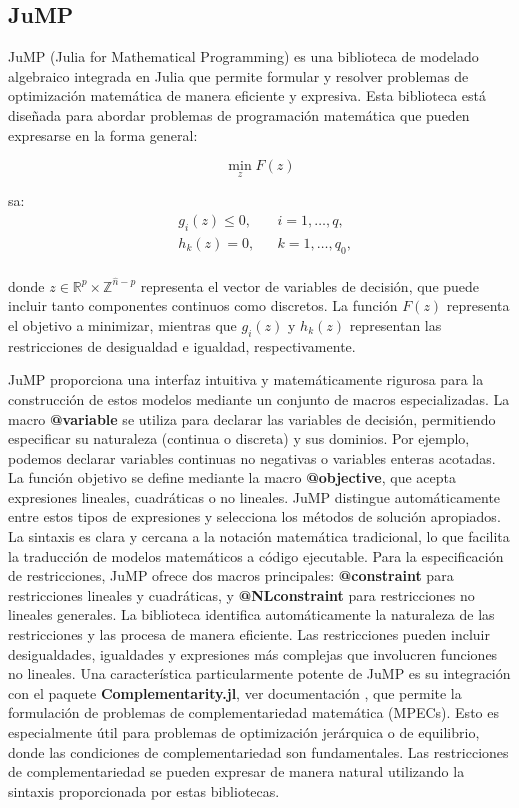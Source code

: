 \subsection*{JuMP}
JuMP (Julia for Mathematical Programming) es una biblioteca de modelado algebraico integrada en Julia que permite formular y resolver problemas de optimización matemática de manera eficiente y expresiva. Esta biblioteca está diseñada para abordar problemas de programación matemática que pueden expresarse en la forma general:

\begin{equation}
\min_{z} F(z)
\end{equation}

sa:
\begin{equation}
\begin{aligned}
    & g_i(z) \leq 0, && i = 1,\ldots,q,  \\
    & h_k(z)  = 0, && k = 1,\ldots,q_0,\\
\end{aligned}
\end{equation}

donde \(z \in \mathbb{R}^p \times \mathbb{Z}^{\hat{n}-p}\) representa el vector de variables de decisión, que puede incluir tanto componentes continuos como discretos. La función \(F(z)\) representa el objetivo a minimizar, mientras que \(g_i(z)\) y \(h_k(z)\) representan las restricciones de desigualdad e igualdad, respectivamente.

JuMP proporciona una interfaz intuitiva y matemáticamente rigurosa para la construcción de estos modelos mediante un conjunto de macros especializadas. La macro \textbf{@variable} se utiliza para declarar las variables de decisión, permitiendo especificar su naturaleza (continua o discreta) y sus dominios. Por ejemplo, podemos declarar variables continuas no negativas o variables enteras acotadas. La función objetivo se define mediante la macro \textbf{@objective}, que acepta expresiones lineales, cuadráticas o no lineales. JuMP distingue automáticamente entre estos tipos de expresiones y selecciona los métodos de solución apropiados. La sintaxis es clara y cercana a la notación matemática tradicional, lo que facilita la traducción de modelos matemáticos a código ejecutable. Para la especificación de restricciones, JuMP ofrece dos macros principales: \textbf{@constraint} para restricciones lineales y cuadráticas, y \textbf{@NLconstraint} para restricciones no lineales generales. La biblioteca identifica automáticamente la naturaleza de las restricciones y las procesa de manera eficiente. Las restricciones pueden incluir desigualdades, igualdades y expresiones más complejas que involucren funciones no lineales. Una característica particularmente potente de JuMP es su integración con el paquete \textbf{Complementarity.jl}, ver documentación \cite{Complementarityjl}, que permite la formulación de problemas de complementariedad matemática (MPECs). Esto es especialmente útil para problemas de optimización jerárquica o de equilibrio, donde las condiciones de complementariedad son fundamentales. Las restricciones de complementariedad se pueden expresar de manera natural utilizando la sintaxis proporcionada por estas bibliotecas.

